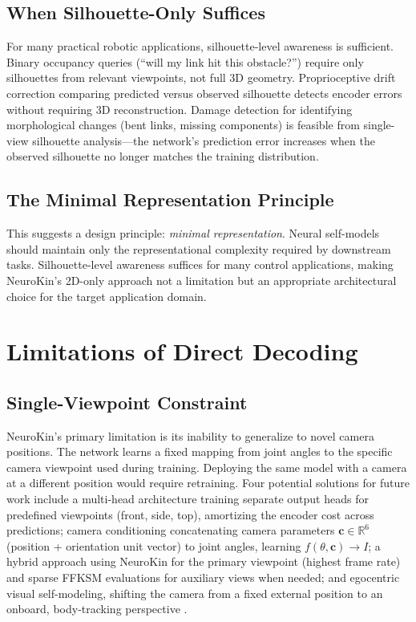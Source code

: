 \documentclass[12pt,a4paper,oneside]{report}
\begin{document}
\subsection{When Silhouette-Only Suffices}

For many practical robotic applications, silhouette-level awareness is sufficient. Binary occupancy queries (``will my link hit this obstacle?'') require only silhouettes from relevant viewpoints, not full 3D geometry. Proprioceptive drift correction comparing predicted versus observed silhouette detects encoder errors without requiring 3D reconstruction. Damage detection for identifying morphological changes (bent links, missing components) is feasible from single-view silhouette analysis---the network's prediction error increases when the observed silhouette no longer matches the training distribution.

\subsection{The Minimal Representation Principle}

This suggests a design principle: \textit{minimal representation}. Neural self-models should maintain only the representational complexity required by downstream tasks. Silhouette-level awareness suffices for many control applications, making NeuroKin's 2D-only approach not a limitation but an appropriate architectural choice for the target application domain.

\section{Limitations of Direct Decoding}

\subsection{Single-Viewpoint Constraint}

NeuroKin's primary limitation is its inability to generalize to novel camera positions. The network learns a fixed mapping from joint angles to the specific camera viewpoint used during training. Deploying the same model with a camera at a different position would require retraining. Four potential solutions for future work include a multi-head architecture training separate output heads for predefined viewpoints (front, side, top), amortizing the encoder cost across predictions; camera conditioning concatenating camera parameters $\mathbf{c} \in \mathbb{R}^6$ (position + orientation unit vector) to joint angles, learning $f(\theta, \mathbf{c}) \rightarrow I$; a hybrid approach using NeuroKin for the primary viewpoint (highest frame rate) and sparse FFKSM evaluations for auxiliary views when needed; and egocentric visual self-modeling, shifting the camera from a fixed external position to an onboard, body-tracking perspective \cite{hu2024egocentric}.
\end{document}
